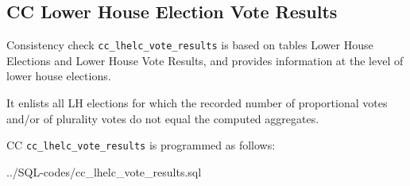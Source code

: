 \subsection{CC Lower House Election Vote Results}\label{cc_lhelc_vote_results}
Consistency check \texttt{\footnotesize cc\_lhelc\_vote\_results} is based on tables Lower House Elections and Lower House Vote Results, and provides information at the level of lower house elections. 


It enlists all LH elections for which the recorded number of proportional votes and/or of plurality votes do not equal the computed aggregates.

CC \texttt{\footnotesize cc\_lhelc\_vote\_results} is programmed as follows:

%
{../SQL-codes/cc_lhelc_vote_results.sql}
